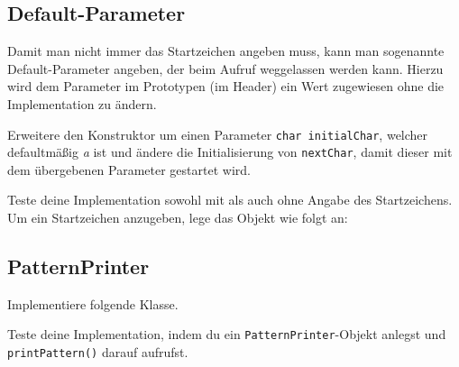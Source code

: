 \subsection{Default-Parameter}
Damit man nicht immer das Startzeichen angeben muss, kann man sogenannte Default-Parameter angeben, der beim Aufruf weggelassen werden kann.
Hierzu wird dem Parameter im Prototypen (im Header) ein Wert zugewiesen ohne die Implementation zu ändern.

  

Erweitere den Konstruktor um einen Parameter \lstinline{char initialChar}, welcher defaultmäßig \emph{a} ist und ändere die Initialisierung von \lstinline{nextChar}, damit dieser mit dem übergebenen Parameter gestartet wird.

Teste deine Implementation sowohl mit als auch ohne Angabe des Startzeichens.
Um ein Startzeichen anzugeben, lege das Objekt wie folgt an:

  


\subsection{PatternPrinter}
Implementiere folgende Klasse.

  

Teste deine Implementation, indem du ein \lstinline{PatternPrinter}-Objekt anlegst und \lstinline{printPattern()} darauf aufrufst.

